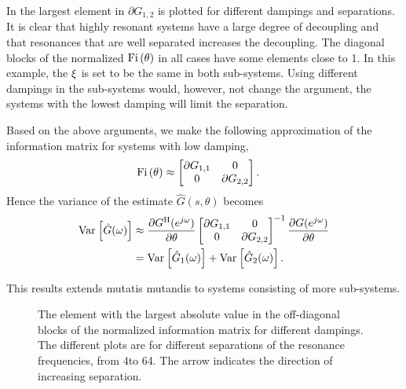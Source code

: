 In  the largest element in $\partial G_{1,2}$ is plotted for different dampings and separations. It is clear that highly resonant systems have a large degree of decoupling and that resonances that are well separated increases the decoupling. The diagonal blocks of the normalized $\mathrm{Fi} \left(\theta\right)$ in all cases have some elements close to 1. In this example, the $\xi$ is set to be the same in both sub-systems. Using different dampings in the sub-systems would, however, not change the argument, the systems with the lowest damping will limit the separation.

Based on the above arguments, we make the following approximation of the information matrix for systems with low damping,
\begin{align}
\mathrm{Fi} \left(\theta\right)&\approx \begin{bmatrix}\partial G_{1,1} &0\\
                        0&\partial G_{2,2}\end{bmatrix}.
\end{align}
Hence the variance of the estimate $\hat{G}(s,\theta)$ becomes
\begin{align}
\operatorname{\mathrm{Var}}_{} \left[ \hat{G}(\omega) \right] &\approx \frac{\partial G^{\mathrm{H}}(e^{j\omega})}{\partial \theta}\begin{bmatrix}\partial G_{1,1} &0\\
                        0&\partial G_{2,2}\end{bmatrix}^{-1}\frac{\partial G(e^{j\omega})}{\partial \theta}\\
&=\operatorname{\mathrm{Var}}_{} \left[ \hat{G}_1(\omega) \right] + \operatorname{\mathrm{Var}}_{} \left[ \hat{G}_2(\omega) \right].
\end{align}

This results extends mutatis mutandis to systems consisting of more sub-systems.

\begin{figure}
\centering

\caption{The element with the largest absolute value in the off-diagonal blocks of the normalized information matrix for different dampings.
         The different plots are for different separations of the resonance frequencies, from 4\wdB to 64\wdB.
         The arrow indicates the direction of increasing separation.}
\label{fig:excitation:coupling}
\end{figure}


